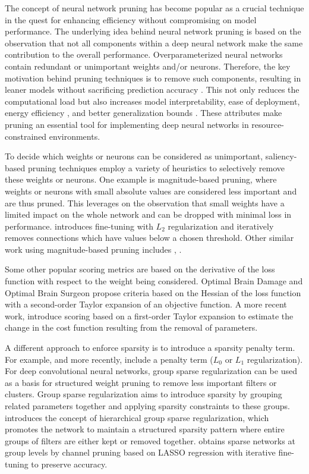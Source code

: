The concept of neural network pruning has become popular as a crucial technique in the quest for enhancing efficiency without compromising on model performance. The underlying idea behind neural network pruning is based on the observation that not all components within a deep neural network make the same contribution to the overall performance. Overparameterized neural networks contain redundant or unimportant weights and/or neurons. Therefore, the key motivation behind pruning techniques is to remove such components, resulting in leaner models without sacrificing prediction accuracy \autocite{riera22}. This not only reduces the computational load but also increases model interpretability, ease of deployment, energy efficiency \autocite{han16}, and better generalization bounds \autocite{arora18}. These attributes make pruning an essential tool for implementing deep neural networks in resource-constrained environments.

To decide which weights or neurons can be considered as unimportant, saliency-based pruning techniques employ a variety of heuristics to selectively remove these weights or neurons. One example is magnitude-based pruning, where weights or neurons with small absolute values are considered less important and are thus pruned. This leverages on the observation that small weights have a limited impact on the whole network and can be dropped with minimal loss in performance. \textcite{han15} introduces fine-tuning with $L_2$ regularization and iteratively removes connections which have values below a chosen threshold. Other similar work using magnitude-based pruning includes \textcite{janowski89}, \textcite{han16}.

Some other popular scoring metrics are based on the derivative of the loss function with respect to the weight being considered. Optimal Brain Damage \autocite{lecun89} and Optimal Brain Surgeon \autocite{hassibi92} propose criteria based on the Hessian of the loss function with a second-order Taylor expansion of an objective function. A more recent work, \textcite{molchanov17} introduce scoring based on a first-order Taylor expansion to estimate the change in the cost function resulting from the removal of parameters.

A different approach to enforce sparsity is to introduce a sparsity penalty term. For example, \textcite{chauvin88} and more recently, \textcite{louizos18} include a penalty term ($L_0$ or $L_1$ regularization). For deep convolutional neural networks, group sparse regularization can be used as a basis for structured weight pruning to remove less important filters or clusters. Group sparse regularization aims to introduce sparsity by grouping related parameters together and applying sparsity constraints to these groups. \textcite{mitsuno20} introduces the concept of hierarchical group sparse regularization, which promotes the network to maintain a structured sparsity pattern where entire groups of filters are either kept or removed together. \textcite{he2017} obtains sparse networks at group levels by channel pruning based on LASSO regression with iterative fine-tuning to preserve accuracy.

